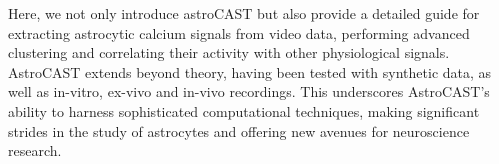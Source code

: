 Here, we not only introduce astroCAST but also provide a detailed guide for extracting astrocytic calcium signals from video data, performing advanced clustering and correlating their activity with other physiological signals. AstroCAST extends beyond theory, having been tested with synthetic data, as well as in-vitro, ex-vivo and in-vivo recordings. This underscores AstroCAST’s ability to harness sophisticated computational techniques, making significant strides in the study of astrocytes and offering new avenues for neuroscience research.
